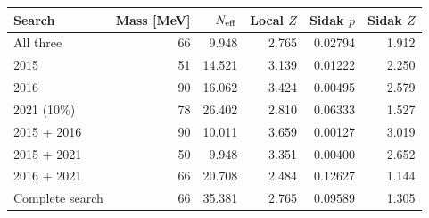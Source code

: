 \begin{tabular}{lrrrrr}\toprule
Search & Mass [MeV] & $N_{\rm eff}$ & Local $Z$ & Sidak $p$ & Sidak $Z$\\\midrule
All three & 66 & 9.948 & 2.765 & 0.02794 & 1.912\\
2015 & 51 & 14.521 & 3.139 & 0.01222 & 2.250\\
2016 & 90 & 16.062 & 3.424 & 0.00495 & 2.579\\
2021 (10\%) & 78 & 26.402 & 2.810 & 0.06333 & 1.527\\
2015 + 2016 & 90 & 10.011 & 3.659 & 0.00127 & 3.019\\
2015 + 2021 & 50 & 9.948 & 3.351 & 0.00400 & 2.652\\
2016 + 2021 & 66 & 20.708 & 2.484 & 0.12627 & 1.144\\
Complete search & 66 & 35.381 & 2.765 & 0.09589 & 1.305\\
\bottomrule\end{tabular}
